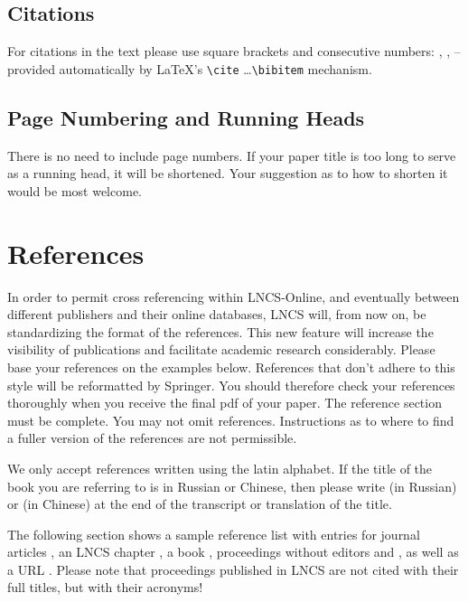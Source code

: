\documentclass[runningheads,a4paper]{llncs}
\begin{document}
\subsection{Citations}

For citations in the text please use
square brackets and consecutive numbers: \cite{jour}, \cite{lncschap},
\cite{proceeding1} -- provided automatically
by \LaTeX 's \verb|\cite| \dots\verb|\bibitem| mechanism.

\subsection{Page Numbering and Running Heads}

There is no need to include page numbers. If your paper title is too
long to serve as a running head, it will be shortened. Your suggestion
as to how to shorten it would be most welcome.

\section{References}\label{references}

\newpage


In order to permit cross referencing within LNCS-Online, and eventually
between different publishers and their online databases, LNCS will,
from now on, be standardizing the format of the references. This new
feature will increase the visibility of publications and facilitate
academic research considerably. Please base your references on the
examples below. References that don't adhere to this style will be
reformatted by Springer. You should therefore check your references
thoroughly when you receive the final pdf of your paper.
The reference section must be complete. You may not omit references.
Instructions as to where to find a fuller version of the references are
not permissible.

We only accept references written using the latin alphabet. If the title
of the book you are referring to is in Russian or Chinese, then please write
(in Russian) or (in Chinese) at the end of the transcript or translation
of the title.

The following section shows a sample reference list with entries for
journal articles \cite{jour}, an LNCS chapter \cite{lncschap}, a book
\cite{book}, proceedings without editors \cite{proceeding1} and
\cite{proceeding2}, as well as a URL \cite{url}.
Please note that proceedings published in LNCS are not cited with their
full titles, but with their acronyms!
\end{document}
